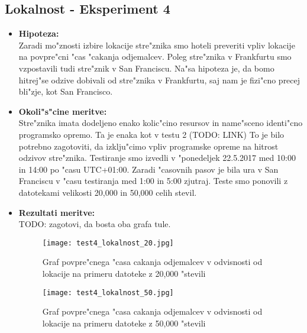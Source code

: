 \subsection{Lokalnost - Eksperiment 4}
\begin{itemize}
	\item \textbf{Hipoteza: }  \\
		Zaradi mo"znosti izbire lokacije stre"znika smo hoteli preveriti vpliv lokacije na povpre"cni "cas "cakanja odjemalcev. Poleg stre"znika v Frankfurtu smo vzpostavili tudi stre"znik v San Franciscu. Na"sa hipoteza je, da bomo hitrej"se odzive dobivali od stre"znika v Frankfurtu, saj nam je fizi"cno precej bli"zje, kot San Francisco.
			
	\item \textbf{Okoli"s"cine meritve: } \\
		Stre"znika imata dodeljeno enako kolic"cino resursov in name"sceno identi"cno programsko opremo. Ta je enaka kot v testu 2 (TODO: LINK) To je bilo potrebno zagotoviti, da izklju"cimo vpliv programske opreme na hitrost odzivov stre"znika. Testiranje smo izvedli v "ponedeljek 22.5.2017 med 10:00 in 14:00 po "casu UTC+01:00. Zaradi "casovnih pasov je bila ura v San Franciscu v "casu testiranja med 1:00 in 5:00 zjutraj. Teste smo ponovili z datotekami velikosti 20,000 in 50,000 celih stevil. 

 	\item \textbf{Rezultati meritve: }  \\
		TODO: zagotovi, da bosta oba grafa tule.
		\begin{figure}[!h]
  		\centering
  		  \texttt{[image: test4\_lokalnost\_20.jpg]}
  		\caption{Graf povpre"cnega "casa cakanja odjemalcev v odvisnosti od lokacije na primeru datoteke z 20,000 "stevili}
  		\label{8_graf_lokanlost_20}
		\end{figure}

		\begin{figure}[!h]
  		\centering
  		  \texttt{[image: test4\_lokalnost\_50.jpg]}
  		\caption{Graf povpre"cnega "casa cakanja odjemalcev v odvisnosti od lokacije na primeru datoteke z 50,000 "stevili}
  		\label{8_graf_lokalnost_50}
		\end{figure}


\end{itemize}
